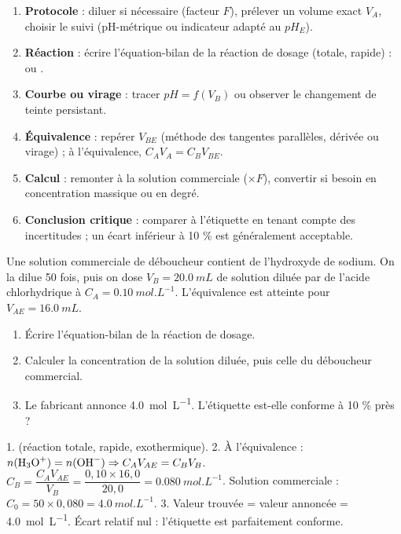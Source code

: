 \documentclass[11pt]{article}
\begin{document}
\begin{aretenir}
\begin{enumerate}
\item \textbf{Protocole} : diluer si nécessaire (facteur $F$), prélever un volume exact $V_A$, choisir le suivi (pH-métrique ou indicateur adapté au $pH_E$).
\item \textbf{Réaction} : écrire l'équation-bilan de la réaction de dosage (totale, rapide) :  ou .
\item \textbf{Courbe ou virage} : tracer $pH = f(V_B)$ ou observer le changement de teinte persistant.
\item \textbf{Équivalence} : repérer $V_{BE}$ (méthode des tangentes parallèles, dérivée ou virage) ; à l'équivalence, $C_A V_A = C_B V_{BE}$.
\item \textbf{Calcul} : remonter à la solution commerciale ($\times F$), convertir si besoin en concentration massique ou en degré.
\item \textbf{Conclusion critique} : comparer à l'étiquette en tenant compte des incertitudes ; un écart inférieur à 10 \% est généralement acceptable.
\end{enumerate}
\end{aretenir}

\begin{exercice}
Une solution commerciale de déboucheur contient de l'hydroxyde de sodium. On la dilue 50 fois, puis on dose $V_B = \SI{20,0}{mL}$ de solution diluée par de l'acide chlorhydrique à $C_A = \SI{0,10}{mol.L^{-1}}$. L'équivalence est atteinte pour $V_{AE} = \SI{16,0}{mL}$.
\begin{enumerate}
\item Écrire l'équation-bilan de la réaction de dosage.
\item Calculer la concentration de la solution diluée, puis celle du déboucheur commercial.
\item Le fabricant annonce \SI{4,0}{mol.L^{-1}}. L'étiquette est-elle conforme à 10 \% près ?
\end{enumerate}
\end{exercice}

\begin{corrige}[Exercice]
1.  (réaction totale, rapide, exothermique).
2. À l'équivalence : $n(\ce{H3O+}) = n(\ce{OH-}) \Rightarrow C_A V_{AE} = C_B V_B$.
$C_B = \dfrac{C_A V_{AE}}{V_B} = \dfrac{0,10 \times 16,0}{20,0} = \SI{0,080}{mol.L^{-1}}$.
Solution commerciale : $C_0 = 50 \times 0,080 = \SI{4,0}{mol.L^{-1}}$.
3. Valeur trouvée = valeur annoncée = \SI{4,0}{mol.L^{-1}}. Écart relatif nul : l'étiquette est parfaitement conforme.
\end{corrige}
\end{document}
